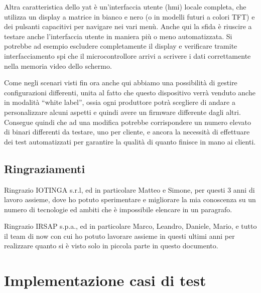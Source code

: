 \documentclass[12pt,a4paper,twoside,titlepage]{book}
\begin{document}
Altra caratteristica dello \acrshort{yat} è un'interfaccia utente (\acrshort{hmi})
locale completa, che utilizza un display a matrice in bianco e nero (o in modelli
futuri a colori TFT) e dei pulsanti capacitivi per navigare nei vari menù. Anche
qui la sfida è riuscire a testare anche l'interfaccia utente in maniera più o meno
automatizzata. Si potrebbe ad esempio escludere completamente il display e verificare
tramite interfacciamento \Gls{spi} che il microcontrollore arrivi a scrivere i dati correttamente
nella memoria video dello schermo.

Come negli scenari visti fin ora anche qui abbiamo una possibilità di gestire configurazioni
differenti, unita al fatto che questo dispositivo verrà venduto anche in modalità ``white label'',
ossia ogni produttore potrà scegliere di andare a personalizzare alcuni aspetti e quindi
avere un \gls{firmware} differente dagli altri. Consegue quindi che ad una modifica potrebbe
corrispondere un numero elevato di binari differenti da testare, uno per cliente, e
ancora la necessità di effettuare dei test automatizzati per garantire la qualità di
quanto finisce in mano ai clienti.

\section{Ringraziamenti}

Ringrazio IOTINGA s.r.l, ed in particolare Matteo e Simone, per questi 3 anni di
lavoro assieme, dove ho potuto sperimentare e migliorare la mia conoscenza su un
numero di tecnologie ed ambiti che è impossibile elencare in un paragrafo.

Ringrazio IRSAP s.p.a., ed in particolare Marco, Leandro, Daniele, Mario, e tutto il team
di \Gls{now} con cui ho potuto lavorare assieme in questi ultimi anni per realizzare
quanto si è visto solo in piccola parte in questo documento.

\appendix

\chapter{Implementazione casi di test}
\section{}
\label{section:impl_test_pairing}
\inputminted[]{python3}{src/test_pairing.py}

\section{}
\label{section:impl_test_downgrade}
\inputminted[]{python3}{src/test_downgrade.py}
\end{document}
